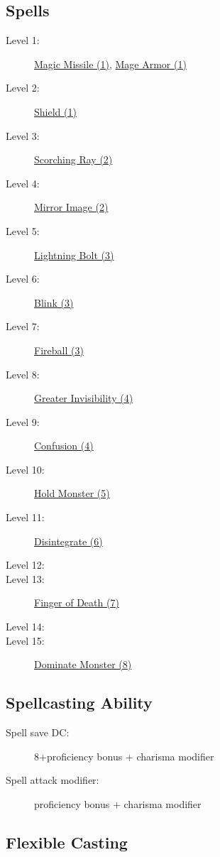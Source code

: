 \documentclass[letterpaper,10pt,twoside,twocolumn,openany]{book}
\begin{document}
\subsection{Spells}

\begin{description}
	\item[Level 1:] \hyperlink{Magic Missile}{Magic Missile (1)}, \hyperlink{Mage Armor}{Mage Armor (1)}
	\item[Level 2:] \hyperlink{Shield}{Shield (1)}
	\item[Level 3:] \hyperlink{Scorching Ray}{Scorching Ray (2)}	 
	\item[Level 4:] \hyperlink{Mirror Image}{Mirror Image (2)}
	\item[Level 5:] \hyperlink{Lightning Bolt}{Lightning Bolt (3)}
	\item[Level 6:] \hyperlink{Blink}{Blink (3)}
	\item[Level 7:] \hyperlink{Fireball}{Fireball (3)}
	\item[Level 8:] \hyperlink{Greater Invisibility}{Greater Invisibility (4)}
	\item[Level 9:] \hyperlink{Confusion}{Confusion (4)}
	\item[Level 10:] \hyperlink{Hold Monster}{Hold Monster (5)}
	\item[Level 11:] \hyperlink{Disintegrate}{Disintegrate (6)}
	\item[Level 12:]
	\item[Level 13:] \hyperlink{Finger of Death}{Finger of Death (7)}
	\item[Level 14:] 
	\item[Level 15:] \hyperlink{Dominate Monster}{Dominate Monster (8)}
\end{description}

\subsection{Spellcasting Ability}

\begin{description}
	\item[Spell save DC:] 8+proficiency bonus + charisma modifier
	\item[Spell attack modifier:] proficiency bonus + charisma modifier
\end{description}

\subsection{Flexible Casting}
\end{document}
